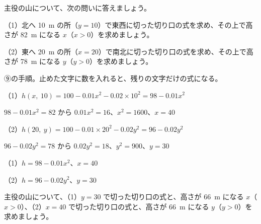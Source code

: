 \begin{reidai}[切り口の関数]
主役の山について、次の問いに答えましょう。\par
（1）北へ \qty{10}{m} の所（$y=10$）で東西に切った切り口の式を求め、その上で高さが \qty{82}{m} になる $x$（$x>0$）を求めましょう。\par
（2）東へ \qty{20}{m} の所（$x=20$）で南北に切った切り口の式を求め、その上で高さが \qty{78}{m} になる $y$（$y>0$）を求めましょう。\par
\kangaekata ⑨の手順。止めた文字に数を入れると、残りの文字だけの式になる。\par
\shiki\kviiibs{}\zw{} （1）$h(x,\ 10)=100-0.01x^2-0.02\times10^2=98-0.01x^2$\par
\kviiibii $98-0.01x^2=82$ から $0.01x^2=16$、$x^2=1600$、$x=40$\par
\kviiibi （2）$h(20,\ y)=100-0.01\times20^2-0.02y^2=96-0.02y^2$\par
\kviiibii $96-0.02y^2=78$ から $0.02y^2=18$、$y^2=900$、$y=30$\par
\kotae\kviiibs{}\zw{} （1）$h=98-0.01x^2$、$x=40$\par
\kviiibi （2）$h=96-0.02y^2$、$y=30$
\end{reidai}

\begin{jibun}
主役の山について、（1）$y=30$ で切った切り口の式と、高さが \qty{66}{m} になる $x$（$x>0$）、（2）$x=40$ で切った切り口の式と、高さが \qty{66}{m} になる $y$（$y>0$）を求めましょう。
\end{jibun}

